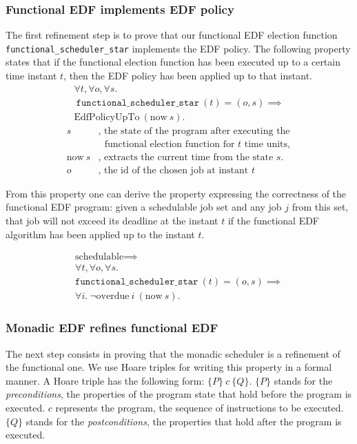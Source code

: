 	\subsubsection{Functional EDF implements EDF policy}
	\label{sec:functional}
	The first refinement step is to prove that our functional EDF election function \texttt{functional\_scheduler\_star} implements the EDF policy. The following property states that if the functional election function has been executed up to a certain time instant $t$, then the EDF policy has been applied up to that instant.
	\begin{gather*}
		\forall t, \forall o, \forall s.\\ 
		~\texttt{functional\_scheduler\_star}~(t) = (o,s) \implies\\
		\text{EdfPolicyUpTo}~(\text{now}~s).
	\end{gather*}
	\begin{align*}
              s&\text{, the state of the program after executing the}\\
	       &\text{~~functional election function for $t$ time units},\\
              \text{now}~s&\text{, extracts the current time from the state $s$.}\\
	      o~&\text{, the id of the chosen job at instant $t$}
	\end{align*}

From this property one can derive the property expressing the correctness of the functional EDF program:
given a schedulable job set and any job $j$ from this set, that job will not exceed its deadline at the instant $t$ if the functional EDF algorithm has been applied up to the instant $t$.

	\begin{gather*}
		\text{schedulable} \implies\\
		\forall t, \forall o, \forall s.\\
		\texttt{functional\_scheduler\_star}~(t) = (o,s) \implies\\
		\forall i.~\neg \text{overdue}~i~(\text{now}~s).
	\end{gather*}

	\subsubsection{Monadic EDF refines functional EDF}
	\label{sec:monadic}
	The next step consists in proving that the monadic scheduler is a refinement of the functional one. We  use Hoare triples \cite{hoare1969axiomatic} for writing this property in a formal manner.
	A Hoare triple has the following form: $\{ P \}~c~\{ Q \}$. $\{ P \}$ stands for the \emph{preconditions}, the properties of the program state that hold before the program is executed. $c$ represents the program, the sequence of instructions to be executed. $\{Q \}$ stands for the \emph{postconditions}, the properties that hold after the program is executed.

